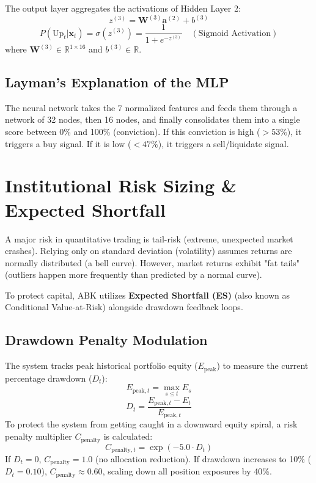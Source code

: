 \documentclass[11pt,a4paper]{article}
\begin{document}
The output layer aggregates the activations of Hidden Layer 2:
\begin{equation}
    z^{(3)} = \mathbf{W}^{(3)} \mathbf{a}^{(2)} + b^{(3)}
\end{equation}
\begin{equation}
    P(\text{Up}_t | \mathbf{x}_t) = \sigma(z^{(3)}) = \frac{1}{1 + e^{-z^{(3)}}} \quad (\text{Sigmoid Activation})
\end{equation}
where $\mathbf{W}^{(3)} \in \mathbb{R}^{1 \times 16}$ and $b^{(3)} \in \mathbb{R}$.

\subsection{Layman's Explanation of the MLP}
The neural network takes the 7 normalized features and feeds them through a network of 32 nodes, then 16 nodes, and finally consolidates them into a single score between 0\% and 100\% (conviction). If this conviction is high ($>53\%$), it triggers a buy signal. If it is low ($<47\%$), it triggers a sell/liquidate signal.

\newpage
\section{Institutional Risk Sizing \& Expected Shortfall}

A major risk in quantitative trading is tail-risk (extreme, unexpected market crashes). Relying only on standard deviation (volatility) assumes returns are normally distributed (a bell curve). However, market returns exhibit "fat tails" (outliers happen more frequently than predicted by a normal curve).

To protect capital, ABK utilizes \textbf{Expected Shortfall (ES)} (also known as Conditional Value-at-Risk) alongside drawdown feedback loops.

\subsection{Drawdown Penalty Modulation}

The system tracks peak historical portfolio equity ($E_{\text{peak}}$) to measure the current percentage drawdown ($D_t$):
\begin{equation}
    E_{\text{peak}, t} = \max_{s \le t} E_s
\end{equation}
\begin{equation}
    D_t = \frac{E_{\text{peak}, t} - E_t}{E_{\text{peak}, t}}
\end{equation}
To protect the system from getting caught in a downward equity spiral, a risk penalty multiplier $C_{\text{penalty}}$ is calculated:
\begin{equation}
    C_{\text{penalty}, t} = \exp( -5.0 \cdot D_t )
\end{equation}
If $D_t = 0$, $C_{\text{penalty}} = 1.0$ (no allocation reduction). If drawdown increases to 10\% ($D_t = 0.10$), $C_{\text{penalty}} \approx 0.60$, scaling down all position exposures by 40\%.
\end{document}
